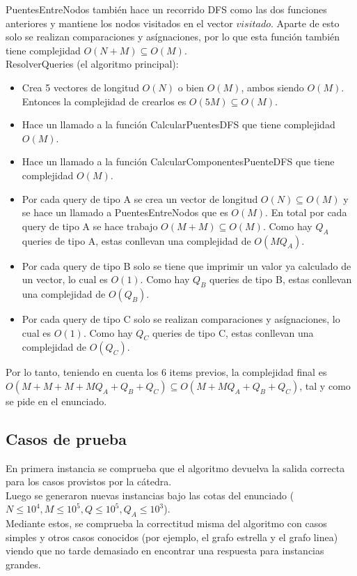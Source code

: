 PuentesEntreNodos también hace un recorrido DFS como las dos funciones anteriores y mantiene los nodos visitados en el vector $visitado$. Aparte
de esto solo se realizan comparaciones y as\'ignaciones, por lo que esta funci\'on tambi\'en tiene complejidad $O(N+M) \subseteq O(M)$. \\

ResolverQueries (el algoritmo principal):
\begin{itemize}
	\item Crea 5 vectores de longitud $O(N)$ o bien $O(M)$, ambos siendo $O(M)$. Entonces la complejidad de crearlos es $O(5M) \subseteq O(M)$.
	\item Hace un llamado a la funci\'on CalcularPuentesDFS que tiene complejidad $O(M)$.
	\item Hace un llamado a la funci\'on CalcularComponentesPuenteDFS que tiene complejidad $O(M)$.
	\item Por cada query de tipo A se crea un vector de longitud $O(N) \subseteq O(M)$ y se hace un llamado a 
	PuentesEntreNodos que es $O(M)$. En total por cada query de tipo A se hace trabajo $O(M+M) \subseteq O(M)$. Como
	hay $Q_A$ queries de tipo A, estas conllevan una complejidad de $O(MQ_A)$.
	\item Por cada query de tipo B solo se tiene que imprimir un valor ya calculado de un vector, lo cual es $O(1)$. Como
	hay $Q_B$ queries de tipo B, estas conllevan una complejidad de $O(Q_B)$.
	\item Por cada query de tipo C solo se realizan comparaciones y as\'ignaciones, lo cual es $O(1)$. Como
	hay $Q_C$ queries de tipo C, estas conllevan una complejidad de $O(Q_C)$.
\end{itemize}

Por lo tanto, teniendo en cuenta los 6 items previos, la complejidad final es $O(M+M+M+MQ_A+Q_B+Q_C) \subseteq O(M+MQ_A+Q_B+Q_C)$, tal y como
se pide en el enunciado.

\subsection{Casos de prueba}

En primera instancia se comprueba que el algoritmo devuelva la salida correcta para los casos provistos por la cátedra. \\
Luego se generaron nuevas instancias bajo las cotas del enunciado ($N  \leq  10^4, M \leq 10^5,Q \leq 10^5,Q_A  \leq 10^3$). \\
Mediante estos, se comprueba la correctitud misma del algoritmo con casos simples y otros casos conocidos 
(por ejemplo, el grafo estrella y el grafo linea) viendo que no tarde demasiado en encontrar una respuesta para instancias grandes. \\

